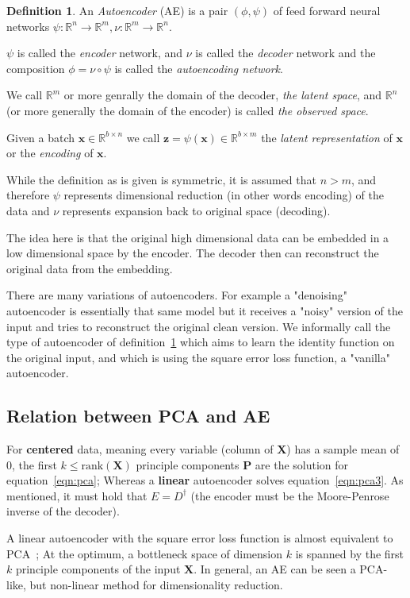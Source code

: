 \documentclass[11pt, a4paper]{report}
\theoremstyle{plain}
\theoremstyle{definition}
\newtheorem{mydef}{Definition}[chapter]
\theoremstyle{remark}
\newcommand{\R}{\mathbb{R}}
\newcommand{\x}{\mathbf{x}}
\newcommand{\z}{\mathbf{z}}
\newcommand{\bv}[1]{\boldsymbol{#1}}
\begin{document}
\begin{mydef}
\label{def:autoencoder}
An \textit{Autoencoder} (AE) is a pair 
$(\phi, \psi)$ of feed forward neural networks 
$\psi : \R^n \to \R^m, \nu : \R^m \to \R^n$.

$\psi$ is called the \emph{encoder} network, and $\nu$ is called the
\emph{decoder} network and the composition
$\phi = \nu \circ \psi$ is called the \emph{autoencoding network}. 

We call $\R^m$ or more genrally the domain of the decoder, \emph{the latent
space}, and $\R^n$ (or more generally the domain of the encoder) is called
\emph{the observed space}.

Given a batch $\x \in \R^{b \times n}$ we call $\z = \psi(\x) \in \R^{b \times m}$
the \emph{latent representation} of $\x$ or the \emph{encoding} of $\x$.
\end{mydef}

While the definition as is given is symmetric, it is assumed that $n > m$, and
therefore $\psi$ represents dimensional reduction (in other words encoding) of
the data and $\nu$ represents expansion back to original space (decoding).

The idea here is that the original high dimensional data can be embedded
in a low dimensional space by the encoder. The decoder then can reconstruct the
original data from the embedding.

There are many variations of autoencoders. For example a "denoising" autoencoder is
essentially that same model but it receives a "noisy" version of the input and
tries to reconstruct the original clean version.
We informally call the type of autoencoder of
definition~\ref{def:autoencoder} which aims to learn the identity function 
on the original input, and which is using the square error loss function, 
a "vanilla" autoencoder. 

\subsection{Relation between PCA and AE}
For \textbf{centered} data, meaning every variable (column of $\bv{X}$)
has a sample mean of $0$, the first $k \leq \text{rank}(\bv{X})$ principle components
$\bv{P}$ are the solution for equation~\ref{eqn:pca}; Whereas a \textbf{linear}
autoencoder solves equation~\ref{eqn:pca3}. As mentioned, it must hold that $E =
D^{\dagger}$ (the encoder must be the Moore-Penrose inverse of the decoder).

A linear autoencoder with the  square error
loss function is almost equivalent to
PCA~\cite{plaut2018principal}; At the optimum, a bottleneck space of dimension $k$
is spanned by the first $k$ principle components of the input $\bv{X}$.
In general, an AE can be seen a PCA-like, but non-linear method for
dimensionality reduction.
\end{document}
